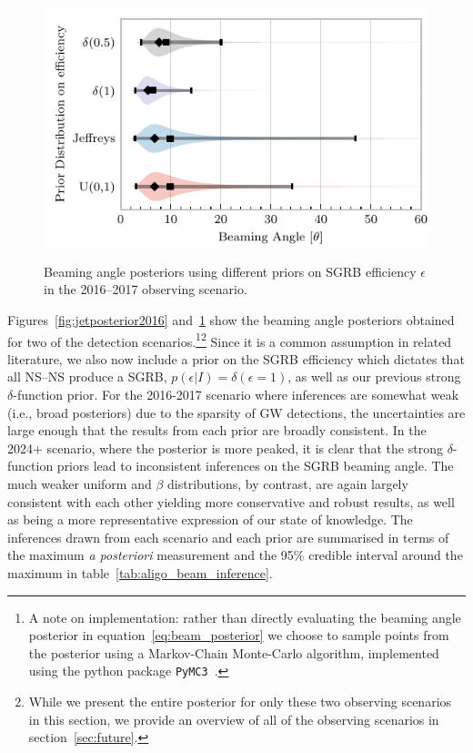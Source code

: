 \documentclass[twocolumn]{aastex61}
\newcommand{\BNS}{\ac{NS}--\ac{NS}\xspace}
\begin{document}
\begin{figure}
\centering
{\includegraphics[width=\linewidth]{O2_beaming_posteriors_violin.pdf}}
\caption{Beaming angle posteriors using different priors on \ac{SGRB} efficiency $\epsilon$ in the 2016--2017 observing scenario.
    \label{fig:jetposterior2017}}
\end{figure}

Figures~\ref{fig:jetposterior2016} and~\ref{fig:jetposterior2017} show
the beaming angle posteriors obtained for two of the detection
scenarios.\footnote{
    A note on implementation: rather than directly evaluating
    the beaming angle posterior in equation~\ref{eq:beam_posterior} we
    choose to sample points from the posterior using a Markov-Chain
    Monte-Carlo algorithm, implemented using the python package
    \texttt{PyMC3}~\cite{salvatier2016probabilistic}.
}\footnote{
    While we present the entire posterior for only these two
    observing scenarios in this section, we provide an overview of all
    of the observing scenarios in section~\ref{sec:future}.}
Since it is a common assumption in related literature, we also now include
a prior on the \ac{SGRB} efficiency which dictates that all \BNS produce a
\ac{SGRB}, $p(\epsilon|I)=\delta(\epsilon=1)$, as well as our previous
strong $\delta$-function prior.  For the 2016-2017 scenario where
inferences are somewhat weak (i.e., broad posteriors) due to the
sparsity of \ac{GW} detections, the uncertainties are large enough
that the results from each prior are broadly consistent.  In the 2024+
scenario, where the posterior is more peaked, it is clear that the
strong $\delta$-function priors lead to inconsistent inferences on the
\ac{SGRB} beaming angle.  The much weaker uniform and $\beta$
distributions, by contrast, are again largely consistent with each
other yielding more conservative and robust results, as well as being
a more representative expression of our state of knowledge.  The
inferences drawn from each scenario and each prior are summarised in
terms of the maximum \emph{a posteriori} measurement and the 95\%
credible interval around the maximum in
table~\ref{tab:aligo_beam_inference}.
\end{document}
